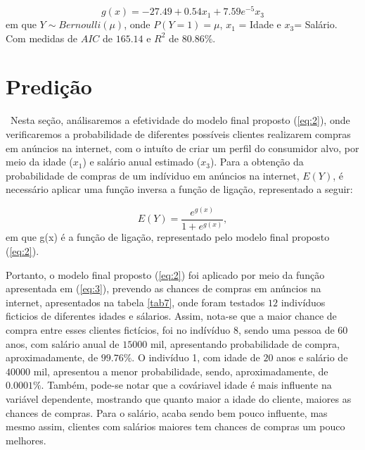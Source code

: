 \documentclass[a4paper]{article}
\begin{document}
\begin{equation}\label{eq:2}
g(x)= -27.49 + 0.54 x_1 + 7.59e^{-5} x_3
\end{equation}
em que $Y \sim Bernoulli(\mu)$, onde $ P(Y=1)=\mu$, $x_1$ = Idade e $x_3$= Salário. Com medidas de $AIC$ de $165.14$ e $R^2$ de $80.86\%$.


\section{Predição}

\quad \ Nesta seção, análisaremos a efetividade do modelo final proposto (\ref{eq:2}), onde verificaremos a probabilidade de diferentes possíveis clientes realizarem compras em anúncios na internet, com o intuíto de criar um perfil do consumidor alvo, por meio da idade ($x_1$) e salário anual estimado ($x_3$). Para a obtenção da probabilidade de compras de um indíviduo em anúncios na internet, $E(Y)$, é necessário aplicar uma função inversa a função de ligação, representado a seguir:

\begin{equation}\label{eq:3}
E(Y) = \frac{e^{g(x)}}{1+e^{g(x)}},
\end{equation}
em que g(x) é a função de ligação, representado pelo modelo final proposto (\ref{eq:2}).

Portanto, o modelo final proposto (\ref{eq:2}) foi aplicado por meio da função apresentada em (\ref{eq:3}), prevendo as chances de compras em anúncios na internet, apresentados na tabela \ref{tab7}, onde foram testados $12$ indivíduos ficticios de diferentes idades e sálarios. Assim, nota-se que a maior chance de compra entre esses clientes fictícios, foi no indívíduo 8, sendo uma pessoa de $60$ anos, com salário anual de $15000$ mil, apresentando probabilidade de compra, aproximadamente, de $99.76\%$. O indivíduo 1, com idade de $20$ anos e salário de $40000$ mil, apresentou a menor probabilidade, sendo, aproximadamente, de $0.0001\%$. Também, pode-se notar que a cováriavel idade é mais influente na variável dependente, mostrando que quanto maior a idade do cliente, maiores as chances de compras. Para o salário, acaba sendo bem pouco influente, mas mesmo assim, clientes com salários maiores tem chances de compras um pouco melhores.
\end{document}
